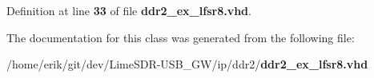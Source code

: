 Definition at line {\bf 33} of file {\bf ddr2\+\_\+ex\+\_\+lfsr8.\+vhd}.



The documentation for this class was generated from the following file\+:\begin{DoxyCompactItemize}
\item 
/home/erik/git/dev/\+Lime\+S\+D\+R-\/\+U\+S\+B\+\_\+\+G\+W/ip/ddr2/{\bf ddr2\+\_\+ex\+\_\+lfsr8.\+vhd}\end{DoxyCompactItemize}
